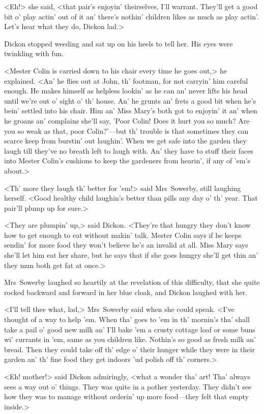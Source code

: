 <Eh!> she said, <that pair's enjoyin' theirselves, I'll warrant. They'll get a good bit o' play actin' out of it an' there's nothin' children likes as much as play actin'. Let's hear what they do, Dickon lad.>

Dickon stopped weeding and sat up on his heels to tell her. His eyes were twinkling with fun.

<Mester Colin is carried down to his chair every time he goes out,> he explained. <An' he flies out at John, th' footman, for not carryin' him careful enough. He makes himself as helpless lookin' as he can an' never lifts his head until we're out o' sight o' th' house. An' he grunts an' frets a good bit when he's bein' settled into his chair. Him an' Miss Mary's both got to enjoyin' it an' when he groans an' complains she'll say, 'Poor Colin! Does it hurt you so much? Are you so weak as that, poor Colin?'—but th' trouble is that sometimes they can scarce keep from burstin' out laughin'. When we get safe into the garden they laugh till they've no breath left to laugh with. An' they have to stuff their faces into Mester Colin's cushions to keep the gardeners from hearin', if any of 'em's about.>

<Th' more they laugh th' better for 'em!> said Mrs~Sowerby, still laughing herself. <Good healthy child laughin's better than pills any day o' th' year. That pair'll plump up for sure.>

<They are plumpin' up,> said Dickon. <They're that hungry they don't know how to get enough to eat without makin' talk. Mester Colin says if he keeps sendin' for more food they won't believe he's an invalid at all. Miss Mary says she'll let him eat her share, but he says that if she goes hungry she'll get thin an' they mun both get fat at once.>

Mrs~Sowerby laughed so heartily at the revelation of this difficulty, that she quite rocked backward and forward in her blue cloak, and Dickon laughed with her.

<I'll tell thee what, lad,> Mrs~Sowerby said when she could speak. <I've thought of a way to help 'em. When tha' goes to 'em in th' mornin's tha' shall take a pail o' good new milk an' I'll bake 'em a crusty cottage loaf or some buns wi' currants in 'em, same as you children like. Nothin's so good as fresh milk an' bread. Then they could take off th' edge o' their hunger while they were in their garden an' th' fine food they get indoors 'ud polish off th' corners.>

<Eh! mother!> said Dickon admiringly, <what a wonder tha' art! Tha' always sees a way out o' things. They was quite in a pother yesterday. They didn't see how they was to manage without orderin' up more food—they felt that empty inside.>

